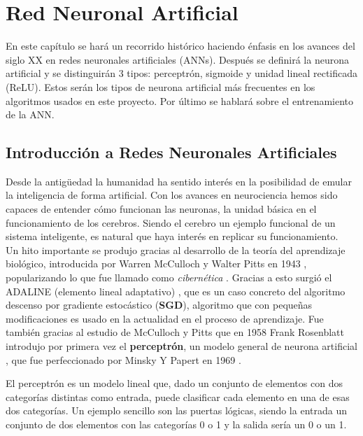 \chapter{Red Neuronal Artificial}\label{redneuronal}

En este capítulo se hará un recorrido histórico haciendo énfasis en los avances del siglo XX en redes neuronales artificiales (ANNs). Después se definirá la neurona artificial y se distinguirán 3 tipos: perceptrón, sigmoide y unidad lineal rectificada (ReLU). Estos serán los tipos de neurona artificial más frecuentes en los algoritmos usados en este proyecto. Por último se hablará sobre el entrenamiento de la ANN.

\section{Introducción a Redes Neuronales Artificiales}\label{subsec:nn_intro}

Desde la antigüedad la humanidad ha sentido interés en la posibilidad de emular la inteligencia de forma artificial. Con los avances en neurociencia hemos sido capaces de entender cómo funcionan las neuronas, la unidad básica en el funcionamiento de los cerebros. Siendo el cerebro un ejemplo funcional de un sistema inteligente, es natural  que haya interés en replicar su funcionamiento.\\

Un hito importante se produjo gracias al desarrollo de la teoría del aprendizaje biológico, introducida por Warren McCulloch y Walter Pitts en 1943 \cite{McCulloch1943}, popularizando lo que fue llamado como \emph{cibernética} \cite[p13]{Goodfellow2016}. Gracias a esto surgió el ADALINE (elemento lineal adaptativo) \cite{Widrow2015}, que es un caso concreto del algoritmo descenso por gradiente estocástico (\textbf{SGD}), algoritmo que con pequeñas modificaciones es usado en la actualidad en el proceso de aprendizaje\cite[p14]{Goodfellow2016}. Fue también gracias al estudio de McCulloch y Pitts que en 1958 Frank Rosenblatt introdujo por primera vez el \textbf{perceptrón}, un modelo general de neurona artificial \cite{Rosenblatt1958}, que fue perfeccionado por Minsky Y Papert en 1969 \cite{Minsky1969}.

El perceptrón es un modelo lineal que, dado un conjunto de elementos con dos categorías distintas como entrada, puede clasificar cada elemento en una de esas dos categorías. Un ejemplo sencillo son las puertas lógicas, siendo la entrada un conjunto de dos elementos con las categorías 0 o 1 y la salida sería un 0 o un 1.

